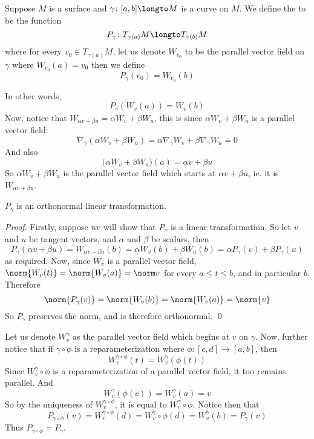 \begin{defn*}

    Suppose $M$ is a surface and $\gamma\colon[a,b]\longto M$ is a curve on $M$.
    We define the  to be the function
    \[ P_\gamma\colon T_{\gamma(a)}M\longto T_{\gamma(b)}M \]
    where for every $v_0\in T_{\gamma(a)}M$, let us denote $W_{v_0}$ to be the parallel vector field on $\gamma$ where $W_{v_0}(a)=v_0$ then we define
    \[ P_\gamma(v_0) = W_{v_0}(b) \]

\end{defn*}

In other words,
\[ P_\gamma(W_v(a)) = W_v(b) \]
Now, notice that $W_{\alpha v+\beta u}=\alpha W_v+\beta W_u$, this is since $\alpha W_v+\beta W_u$ is a parallel vector field:
\[ \nabla_\gamma(\alpha W_v+\beta W_u) = \alpha\nabla_\gamma W_v+\beta\nabla_\gamma W_u = 0 \]
And also
\[ \bigl(\alpha W_v+\beta W_u\bigr)(a) = \alpha v+\beta u \]
So $\alpha W_v+\beta W_u$ is the parallel vector field which starts at $\alpha v+\beta u$, ie. it is $W_{\alpha v+\beta u}$.

\begin{prop*}

    $P_\gamma$ is an orthonormal linear transformation.

\end{prop*}

\begin{proof}

    Firstly, suppose we will show that $P_\gamma$ is a linear transformation.
    So let $v$ and $u$ be tangent vectors, and $\alpha$ and $\beta$ be scalars, then
    \[ P_\gamma(\alpha v+\beta u) = W_{\alpha v+\beta u}(b) = \alpha W_v(b) + \beta W_u(b) = \alpha P_\gamma(v) + \beta P_\gamma(u) \]
    as required.
    Now, since $W_v$ is a parallel vector field, $\norm{W_v(t)}=\norm{W_v(a)}=\norm v$ for every $a\leq t\leq b$, and in particular $b$.
    Therefore
    \[ \norm{P_\gamma(v)} = \norm{W_v(b)} = \norm{W_v(a)} = \norm{v} \]
    So $P_\gamma$ preserves the norm, and is therefore orthonormal.
    \qed

\end{proof}

Let us denote $W_v^\gamma$ as the parallel vector field which begins at $v$ on $\gamma$.
Now, further notice that if $\gamma\circ\phi$ is a reparameterization where $\phi\colon[c,d]\to[a,b]$, then
\[ W_v^{\gamma\circ\phi}(t) = W_v^\gamma(\phi(t)) \]
Since $W_v^\gamma\circ\phi$ is a reparameterization of a parallel vector field, it too remains parallel.
And
\[ W_v^\gamma(\phi(c)) = W_v^\gamma(a) = v \]
So by the uniqueness of $W_v^{\gamma\circ\phi}$, it is equal to $W_v^\gamma\circ\phi$.
Notice then that
\[ P_{\gamma\circ\phi}(v) = W_v^{\gamma\circ\phi}(d) = W_v^\gamma\circ\phi(d) = W_v^\gamma(b) = P_\gamma(v) \]
Thus $P_{\gamma\circ\phi}=P_\gamma$.

